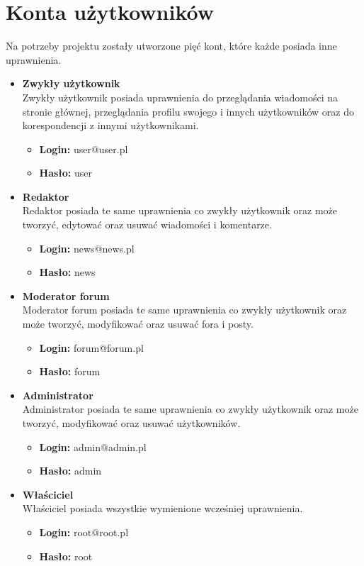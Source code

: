 \documentclass[12pt,oneside]{article}
\begin{document}
\section{Konta użytkowników}
	Na potrzeby projektu zostały utworzone pięć kont, które każde posiada inne uprawnienia.
	\begin{itemize}
		\item \textbf{Zwykły użytkownik} \\
		Zwykły użytkownik posiada uprawnienia do przeglądania wiadomości na stronie głównej, przeglądania profilu swojego i innych użytkowników oraz do korespondencji z innymi użytkownikami.
		\begin{itemize}
			\item \textbf{Login:} user@user.pl
			\item \textbf{Hasło:} user
		\end{itemize}
		\item \textbf{Redaktor} \\
		Redaktor posiada te same uprawnienia co zwykły użytkownik oraz może tworzyć, edytować oraz usuwać wiadomości i komentarze.
		\begin{itemize}
			\item \textbf{Login:} news@news.pl
			\item \textbf{Hasło:} news
		\end{itemize}
		\item \textbf{Moderator forum} \\
		Moderator forum posiada te same uprawnienia co zwykły użytkownik oraz może tworzyć, modyfikować oraz usuwać fora i posty.
		\begin{itemize}
			\item \textbf{Login:} forum@forum.pl
			\item \textbf{Hasło:} forum
		\end{itemize}
		\item \textbf{Administrator} \\
		Administrator posiada te same uprawnienia co zwykły użytkownik oraz może tworzyć, modyfikować oraz usuwać użytkowników.
		\begin{itemize}
			\item \textbf{Login:} admin@admin.pl
			\item \textbf{Hasło:} admin
		\end{itemize}
		\item \textbf{Właściciel} \\
		Właściciel posiada wszystkie wymienione wcześniej uprawnienia.
		\begin{itemize}
			\item \textbf{Login:} root@root.pl
			\item \textbf{Hasło:} root
		\end{itemize}
	\end{itemize}
\end{document}
